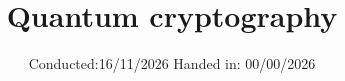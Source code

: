 


\subject{V29}
\title{Quantum cryptography}
\date{%
  Conducted:16/11/2026
  \hspace{3em}
  Handed in: 00/00/2026
}



\maketitle
\thispagestyle{empty}
\tableofcontents
\newpage







\newpage 
\printbibliography{}






